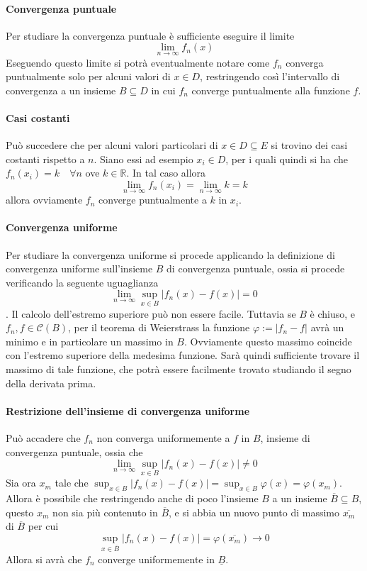 \documentclass[a4paper,12pt]{article}
\newcommand{\cont}{\mathscr{C}}
\begin{document}
\paragraph*{Convergenza puntuale}
Per studiare la convergenza puntuale è sufficiente eseguire il limite
$$\lim_{n\to\infty} f_n(x)$$
Eseguendo questo limite si potrà eventualmente notare come ${f_n}$ converga puntualmente solo per alcuni valori di $x\in D$, restringendo così l'intervallo di convergenza a un insieme $B\subseteq D$ in cui $f_n$ converge puntualmente alla funzione $f$.
\paragraph*{Casi costanti}
Può succedere che per alcuni valori particolari di $x\in D\subseteq E$ si trovino dei casi costanti rispetto a $n$. Siano essi ad esempio $x_i \in D$, per i quali quindi si ha che $f_n(x_i)=k \quad \forall n$  ove $k\in \mathbb{R}$. In tal caso allora 
$$\lim_{n\to\infty} f_n(x_i)=\lim_{n\to\infty} k = k $$
allora ovviamente $f_n$ converge puntualmente a $k$ in $x_i$.
\paragraph*{Convergenza uniforme}
Per studiare la convergenza uniforme si procede applicando la definizione di convergenza uniforme sull'insieme $B$ di convergenza puntuale, ossia si procede verificando la seguente uguaglianza
$$\lim_{n\to\infty} \sup_{x\in B} |f_n(x)- f(x)|=0$$.
Il calcolo dell'estremo superiore può non essere facile. Tuttavia se $B$ è chiuso, e $f_n, f \in\cont(B)$,   per il teorema di Weierstrass la funzione $\varphi:=|f_n-f|$ avrà un minimo e in particolare un massimo in $B$. Ovviamente questo massimo coincide con l'estremo superiore della medesima funzione. Sarà quindi sufficiente trovare il massimo di tale funzione, che potrà essere facilmente trovato studiando il segno della derivata prima.
\paragraph*{Restrizione dell'insieme di convergenza uniforme}
Può accadere che $f_n$ non converga uniformemente a $f$ in $B$, insieme di convergenza puntuale, ossia che 
$$\lim_{n\to\infty} \sup_{x\in B} |f_n(x)- f(x)|\neq 0$$
Sia ora $x_m$ tale che $\sup_{x\in B} |f_n(x)- f(x)|=\sup_{x\in B} \varphi(x)=\varphi (x_m)$. Allora è possibile che restringendo anche di poco l'insieme $B$ a un insieme $\overline{B}\subseteq B$, questo $x_m$ non sia più contenuto in $\overline{B}$, e si abbia un nuovo punto di massimo $\overline{x_m}$ di $\overline{B}$ per cui 
$$ \sup_{x\in \overline{B}} |f_n(x)- f(x)|=\varphi(\overline{x_m})\to 0 $$
Allora si avrà che $f_n$ converge uniformemente in $\underline{B}$.
\end{document}
